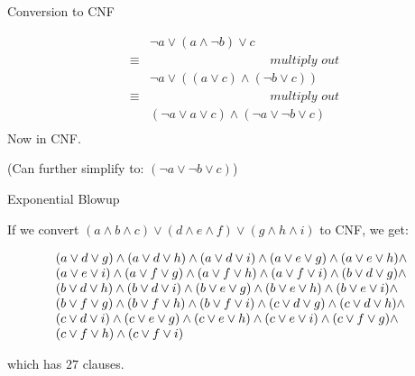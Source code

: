 \documentclass[xetex,aspectratio=169,14pt,hyperref={pdfpagelabels=true,pdflang={en-GB}}]{beamer}
\begin{document}
\begin{frame}
  {Conversion to CNF}

  \begin{displaymath}
    \begin{array}{cl}
             & \lnot a \lor (a \land \lnot b) \lor c \\
      \equiv & \hspace{4cm}\textit{multiply out} \\
             & \lnot a \lor ((a \lor c) \land (\lnot b \lor c)) \\
      \equiv & \hspace{4cm}\textit{multiply out} \\
             & (\lnot a \lor a \lor c) \land (\lnot a \lor \lnot b \lor c) \\
    \end{array}
  \end{displaymath}
  Now in CNF.

  \bigskip

  \textcolor{black!60}{(Can further simplify to: $(\lnot a \lor \lnot b \lor c)$)}
\end{frame}

\begin{frame}
  {Exponential Blowup}

  If we convert
  $(a \land b \land c) \lor (d \land e \land f) \lor (g \land h \land
  i)$ to CNF, we get:

  {\footnotesize
    \begin{displaymath}
      \begin{array}{@{}l}
        (a \lor d \lor g) \land (a \lor d \lor h) \land (a \lor d \lor i) \land (a \lor e \lor g) \land (a \lor e \lor h) \land \\
        (a \lor e \lor i) \land (a \lor f \lor g) \land (a \lor f \lor h) \land (a \lor f \lor i) \land (b \lor d \lor g) \land \\
        (b \lor d \lor h) \land (b \lor d \lor i) \land (b \lor e \lor g) \land (b \lor e \lor h) \land (b \lor e \lor i) \land \\
        (b \lor f \lor g) \land (b \lor f \lor h) \land (b \lor f \lor i) \land (c \lor d \lor g) \land (c \lor d \lor h) \land \\
        (c \lor d \lor i) \land (c \lor e \lor g) \land (c \lor e \lor h) \land (c \lor e \lor i) \land (c \lor f \lor g) \land \\
        (c \lor f \lor h) \land (c \lor f \lor i)
      \end{array}
    \end{displaymath}}

  which has $27$ clauses.

\end{frame}
\end{document}
